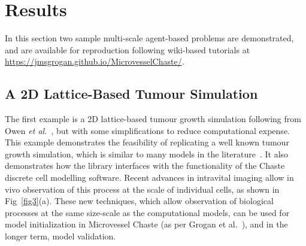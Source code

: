 \documentclass[10pt,letterpaper]{article}
\begin{document}
\section*{Results}

In this section two sample multi-scale agent-based problems are demonstrated, and are available for reproduction following wiki-based tutorials at \url{https://jmsgrogan.github.io/MicrovesselChaste/}.

\subsection*{A 2D Lattice-Based Tumour Simulation}

The first example is a 2D lattice-based tumour growth simulation following from Owen \emph{et al.}~\cite{Owen2011}, but with some simplifications to reduce computational expense. This example demonstrates the feasibility of replicating a well known tumour growth simulation, which is similar to many models in the literature~\cite{Anderson1998, Frieboes2007, Perfahl2011, Connor2015}. It also demonstrates how the library interfaces with the functionality of the Chaste discrete cell modelling software. Recent advances in intravital imaging allow in vivo observation of this process at the scale of individual cells, as shown in Fig~\ref{fig3}(a)\cite{Grogan2016}. These new techniques, which allow observation of biological processes at the same size-scale as the computational models, can be used for model initialization in Microvessel Chaste (as per Grogan et al.~\cite{Grogan2016}), and in the longer term, model validation.
\end{document}
